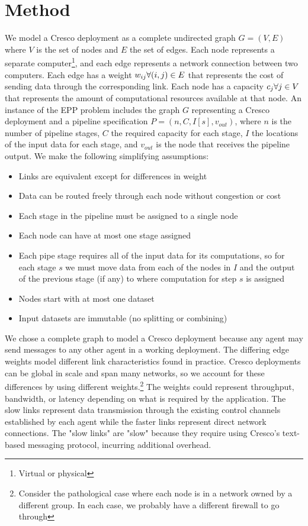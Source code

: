 \documentclass{article}
\newcommand{\forallv}[1]{\ensuremath{\forall #1 \in V}}
\newcommand{\foralle}[2]{\ensuremath{\forall (#1,#2) \in E }}
\newcommand{\eppInstance}{\ensuremath{n,C,I[s],v_{out}}}
\begin{document}
    \section{Method}
	We model a Cresco deployment as a complete undirected graph $G=(V,E)$ where $V$ is the set of nodes and $E$ the set of edges. Each node represents a separate computer\footnote{Virtual or physical}, and each edge represents a network connection between two computers. Each edge has a weight $w_{ij} \space \foralle{i}{j}$ that represents the cost of sending data through the corresponding link. Each node has a capacity $c_{j} \space \forallv{j}$ that represents the amount of computational resources available at that node. An instance of the EPP problem includes the graph $G$ representing a Cresco deployment and a pipeline specification $P = (\eppInstance)$, where  $n$ is the number of pipeline stages, $C$ the required capacity for each stage, $I$ the locations of the input data for each stage, and $v_{out}$ is the node that receives the pipeline output. We make the following simplifying assumptions:
	\begin{itemize}
		\item Links are equivalent except for differences in weight
		\item Data can be routed freely through each node without congestion or cost
		\item Each stage in the pipeline must be assigned to a single node
		\item Each node can have at most one stage assigned
		\item Each pipe stage requires all of the input data for its computations, so for each stage $s$ we must move data from each of the nodes in $I$ and the output of the previous stage (if any) to where computation for step $s$ is assigned
		\item Nodes start with at most one dataset
		\item Input datasets are immutable (no splitting or combining)
	\end{itemize}
	
	We chose a complete graph to model a Cresco deployment because any agent may send messages to any other agent in a working deployment. The differing edge weights model different link characteristics found in practice. Cresco deployments can be global in scale and span many networks, so we account for these differences by using different weights.\footnote{Consider the pathological case where each node is in a network owned by a different group. In each case, we probably have a different firewall to go through} The weights could represent throughput, bandwidth, or latency depending on what is required by the application. The slow links represent data transmission through the existing control channels established by each agent while the faster links represent direct network connections. The "slow links" are "slow" because they require using Cresco's text-based messaging protocol, incurring additional overhead.
	
\end{document}
